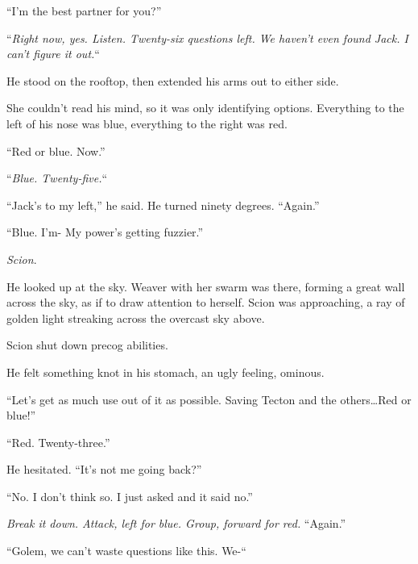 ``I'm the best partner for you?''



``\emph{Right now, yes.  Listen.  Twenty-six questions left.  We haven't even found Jack.  I can't figure it out.}``



He stood on the rooftop, then extended his arms out to either side.



She couldn't read his mind, so it was only identifying options.  Everything to the left of his nose was blue, everything to the right was red.



``Red or blue.  Now.''



``\emph{Blue.  Twenty-five.}``



``Jack's to my left,'' he said.  He turned ninety degrees.  ``Again.''



``Blue.  I'm-  My power's getting fuzzier.''



\emph{Scion}.



He looked up at the sky.  Weaver with her swarm was there, forming a great wall across the sky, as if to draw attention to herself.  Scion was approaching, a ray of golden light streaking across the overcast sky above.



Scion shut down precog abilities.



He felt something knot in his stomach, an ugly feeling, ominous.



``Let's get as much use out of it as possible.  Saving Tecton and the others\ldots Red or blue!''



``Red.  Twenty-three.''



He hesitated.  ``It's not me going back?''



``No.  I don't think so.  I just asked and it said no.''



\emph{Break it down.  Attack, left for blue.  Group, forward for red.  }``Again.''



``Golem, we can't waste questions like this.  We-``



